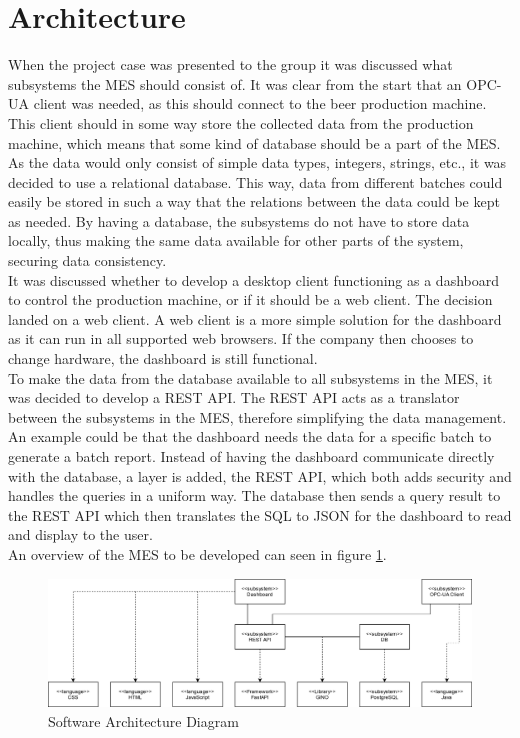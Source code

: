 \section{Architecture}
When the project case was presented to the group it was discussed what
subsystems the MES should consist of. It was clear from the start that an OPC-UA
client was needed, as this should connect to the beer production machine. This
client should in some way store the collected data from the production machine,
which means that some kind of database should be a part of the MES. As the data
would only consist of simple data types, integers, strings, etc., it was decided
to use a relational database. This way, data from different batches could easily
be stored in such a way that the relations between the data could be kept as
needed. By having a database, the subsystems do not have to store data
locally, thus making the same data available for other parts of the system,
securing data consistency. \\

It was discussed whether to develop a desktop client functioning as a dashboard
to control the production machine, or if it should be a web client. The decision
landed on a web client. A web client is a more simple solution for the dashboard
as it can run in all supported web browsers. If the company then chooses to
change hardware, the dashboard is still functional. \\
 

To make the data from the database available to all subsystems in the MES, 
it was decided to develop a REST API. The REST API acts as a translator
between the subsystems in the MES, therefore simplifying the data management.
An example could be that the dashboard needs the data for a specific batch to
generate a batch report. Instead of having the dashboard communicate directly
with the database, a layer is added, the REST API, which both adds security and
handles the queries in a uniform way. The database then sends a query result to
the REST API which then translates the SQL to JSON for the dashboard to read
and display to the user. \\

An overview of the MES to be developed can seen in figure
\ref{figure:architucture_diagram}.

\begin{figure}[ht]
	\centering 
	\includegraphics[scale=0.24]{images/diagrams/architecture_diagram.png}
	\caption{Software Architecture Diagram}
	\label{figure:architucture_diagram} 
\end{figure}
